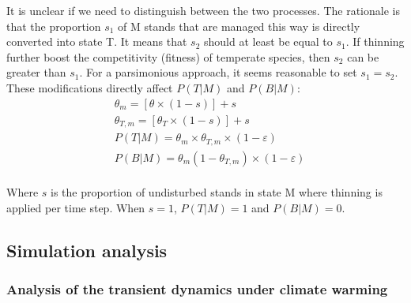 It is unclear if we need to distinguish between the two processes. The
rationale is that the proportion \(s_1\) of M stands that are managed
this way is directly converted into state T. It means that \(s_2\)
should at least be equal to \(s_1\). If thinning further boost the
competitivity (fitness) of temperate species, then \(s_2\) can be
greater than \(s_1\). For a parsimonious approach, it seems reasonable
to set \(s_1=s_2\). These modifications directly affect \(P(T|M)\) and
\(P(B|M)\):\\

\begin{equation}
\begin{split}
&\theta_{m} = [\theta \times (1 - s)] + s \\[2pt]
&\theta_{T, m} = [\theta_{T} \times (1 - s)] + s \\[2pt]
&P(T|M) = \theta_m \times \theta_{T,m} \times (1 - \varepsilon) \\[2pt]
&P(B|M) = \theta_m (1 - \theta_{T,m}) \times (1 - \varepsilon)
\end{split}
\label{eq:thinningEq3}\end{equation}\\

Where \(s\) is the proportion of undisturbed stands in state M where
thinning is applied per time step. When \(s=1\), \(P(T|M) = 1\) and
\(P(B|M) = 0\).\\

\hypertarget{simulation-analysis}{%
\subsection{Simulation analysis}\label{simulation-analysis}}

\hypertarget{analysis-of-the-transient-dynamics-under-climate-warming}{%
\subsubsection{Analysis of the transient dynamics under climate
warming}\label{analysis-of-the-transient-dynamics-under-climate-warming}}

